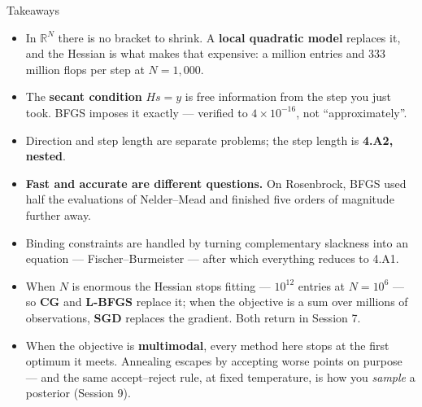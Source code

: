 \begin{frame}{Takeaways}
\begin{takeawaybox}
\begin{itemize}\footnotesize
  \item In $\mathbb{R}^{N}$ there is no bracket to shrink. A \textbf{local quadratic model} replaces it, and the Hessian is what makes that expensive: a million entries and 333 million flops per step at $N=1{,}000$.
  \item The \textbf{secant condition} $Hs=y$ is free information from the step you just took. BFGS imposes it exactly --- verified to $4\times10^{-16}$, not ``approximately''.
  \item Direction and step length are separate problems; the step length is \textbf{4.A2, nested}.
  \item \textbf{Fast and accurate are different questions.} On Rosenbrock, BFGS used half the evaluations of Nelder--Mead and finished five orders of magnitude further away.
  \item Binding constraints are handled by turning complementary slackness into an equation --- Fischer--Burmeister --- after which everything reduces to 4.A1.
  \item When $N$ is enormous the Hessian stops fitting --- $10^{12}$ entries at $N=10^{6}$ --- so \textbf{CG} and \textbf{L-BFGS} replace it; when the objective is a sum over millions of observations, \textbf{SGD} replaces the gradient. Both return in Session 7.
  \item When the objective is \textbf{multimodal}, every method here stops at the first optimum it meets. Annealing escapes by accepting worse points on purpose --- and the same accept--reject rule, at fixed temperature, is how you \emph{sample} a posterior (Session 9).
\end{itemize}
\end{takeawaybox}
\end{frame}

